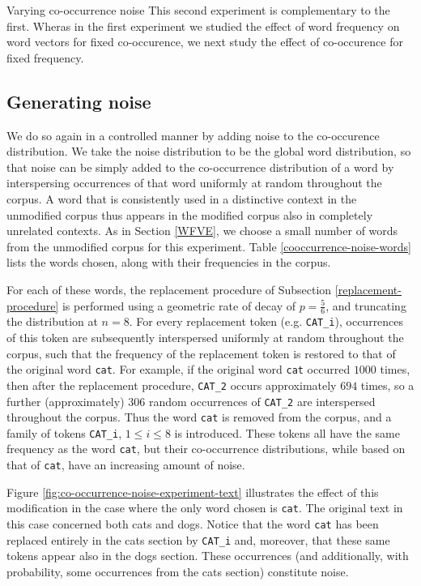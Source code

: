\documentclass{article} %
\newcommand{\word}[1]{\texttt{#1}}
\begin{document}
\begin{section}{Varying co-occurrence noise}\label{CNVE}
This second experiment is complementary to the first.  Wheras in the
first experiment we studied the effect of word frequency on word vectors
for fixed co-occurence, we next study the effect of co-occurence for
fixed frequency.
  
\subsection{Generating noise}
We do so again in a controlled manner by adding noise to the
co-occurence distribution.  We take the noise distribution to be the
global word distribution, so that noise can be simply added to the
co-occurrence distribution of a word by interspersing occurrences of
that word uniformly at random throughout the corpus.  A word that is
consistently used in a distinctive context in the unmodified corpus thus
appears in the modified corpus also in completely unrelated contexts.
As in Section \ref{WFVE}, we choose a small number of words from the
unmodified corpus for this experiment.  Table
\ref{cooccurrence-noise-words} lists the words chosen, along with their
frequencies in the corpus.

For each of these words, the replacement procedure of Subsection
\ref{replacement-procedure} is performed using a geometric rate of decay
of $p = \tfrac{5}{6}$, and truncating the distribution at $n=8$.  For
every replacement token (e.g. \word{CAT\_i}), occurrences of this
token are subsequently interspersed uniformly at random throughout the
corpus, such that the frequency of the replacement token is restored to
that of the original word \word{cat}.  For example, if the original word
\word{cat} occurred $1000$ times, then after the replacement procedure,
\word{CAT\_2} occurs approximately $694$ times, so a further
(approximately) $306$ random occurrences of \word{CAT\_2} are
interspersed throughout the corpus.  Thus the word \word{cat} is removed
from the corpus, and a family of tokens \word{CAT\_i}, $1 \leqslant i
\leqslant 8$ is introduced.  These tokens all have the same frequency as
the word \word{cat}, but their co-occurrence distributions, while based
on that of \word{cat}, have an increasing amount of noise.

Figure \ref{fig:co-occurrence-noise-experiment-text} illustrates the
effect of this modification in the case where the only word chosen is
\word{cat}.  The original text in this case concerned both cats and
dogs.  Notice that the word \word{cat} has been replaced entirely in the
cats section by \word{CAT\_i} and, moreover, that these same tokens
appear also in the dogs section. These occurrences (and additionally,
with probability, some occurrences from the cats section) constitute
noise.


\end{section}
\end{document}
